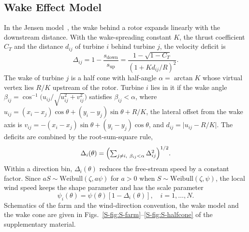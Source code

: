 \documentclass[journal,twoside]{IEEEtran}
\begin{document}
\subsection{Wake Effect Model}
In the Jensen model~\cite{Jensen1983,Katic1986}, the wake behind a rotor expands linearly with the downstream distance. With the wake-spreading constant $K$, the thrust coefficient $C_T$ and the distance $d_{ij}$ of turbine $i$ behind turbine $j$, the velocity deficit is
\begin{equation}
    \Delta_{ij} = 1-\frac{s_{\text{down}}}{s_{\text{up}}}=\frac{1 - \sqrt{1 - C_T}}{\left(1 + K d_{ij}/R\right)^2}.
    \label{eq:deficit}
\end{equation}
The wake of turbine $j$ is a half cone with half-angle $\alpha=\arctan K$ whose virtual vertex lies $R/K$ upstream of the rotor. Turbine $i$ lies in it if the wake angle $\beta_{ij}=\cos^{-1}\!\bigl(u_{ij}/\sqrt{u_{ij}^2+v_{ij}^2}\bigr)$ satisfies $\beta_{ij}<\alpha$, where $u_{ij}=(x_i - x_j)\cos\theta + (y_i - y_j)\sin\theta + R/K$, the lateral offset from the wake axis is $v_{ij}=-(x_i - x_j)\sin\theta + (y_i - y_j)\cos\theta$, and $d_{ij}=\lvert u_{ij}-R/K\rvert$. The deficits are combined by the root-sum-square rule,
\begin{equation}\label{eq5}
\Delta_i(\theta) = \Bigl( \textstyle\sum_{j \ne i,\ \beta_{ij} < \alpha} \Delta_{ij}^2 \Bigr)^{1/2} .
\end{equation}
Within a direction bin, $\Delta_i(\theta)$ reduces the free-stream speed by a constant factor. Since $aS\sim\mathrm{Weibull}(\zeta,a\psi)$ for $a>0$ when $S\sim\mathrm{Weibull}(\zeta,\psi)$, the local wind speed keeps the shape parameter and has the scale parameter
\begin{equation}
\psi_i(\theta) = \psi(\theta)\left[1-\Delta_i(\theta)\right],\quad i=1,\ldots,N. \label{eq:weibull-scale}
\end{equation}
Schematics of the farm and the wind-direction convention, the wake model and the wake cone are given in Figs.~\ref{S-fig:S-farm}--\ref{S-fig:S-halfcone} of the supplementary material.
\end{document}
